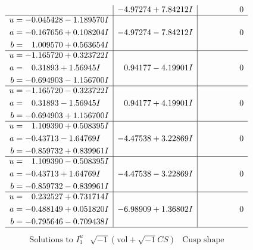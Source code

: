 \documentclass[1p]{elsarticle_modified}
\theoremstyle{definition}
\newcommand{\I}{\sqrt{-1}}
\begin{document}
$$\begin{array}{c|c|c}
 & -4.97274 + 7.84212 I & \phantom{-0.000000 } 0 \\ \hline\begin{aligned}
u &= -0.045428 - 1.189570 I \\
a &= -0.167656 + 0.108204 I \\
b &= \phantom{-}1.009570 + 0.563654 I\end{aligned}
 & -4.97274 - 7.84212 I & \phantom{-0.000000 } 0 \\ \hline\begin{aligned}
u &= -1.165720 + 0.323722 I \\
a &= \phantom{-}0.31893 + 1.56945 I \\
b &= -0.694903 - 1.156700 I\end{aligned}
 & \phantom{-}0.94177 - 4.19901 I & \phantom{-0.000000 } 0 \\ \hline\begin{aligned}
u &= -1.165720 - 0.323722 I \\
a &= \phantom{-}0.31893 - 1.56945 I \\
b &= -0.694903 + 1.156700 I\end{aligned}
 & \phantom{-}0.94177 + 4.19901 I & \phantom{-0.000000 } 0 \\ \hline\begin{aligned}
u &= \phantom{-}1.109390 + 0.508395 I \\
a &= -0.43713 - 1.64769 I \\
b &= -0.859732 + 0.839961 I\end{aligned}
 & -4.47538 + 3.22869 I & \phantom{-0.000000 } 0 \\ \hline\begin{aligned}
u &= \phantom{-}1.109390 - 0.508395 I \\
a &= -0.43713 + 1.64769 I \\
b &= -0.859732 - 0.839961 I\end{aligned}
 & -4.47538 - 3.22869 I & \phantom{-0.000000 } 0 \\ \hline\begin{aligned}
u &= \phantom{-}0.232527 + 0.731714 I \\
a &= -0.488149 + 0.051820 I \\
b &= -0.795646 - 0.709438 I\end{aligned}
 & -6.98909 + 1.36802 I & \phantom{-0.000000 } 0\\
 \hline 
 \end{array}$$\newpage$$\begin{array}{c|c|c}  
\text{Solutions to }I^u_{1}& \I (\text{vol} + \sqrt{-1}CS) & \text{Cusp shape}\\

\end{array}$$
\end{document}
